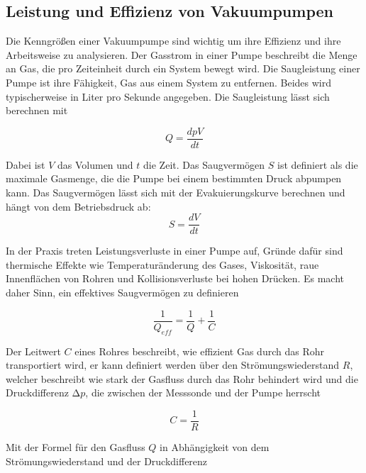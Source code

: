 \subsection{Leistung und Effizienz von Vakuumpumpen}


Die Kenngrößen einer Vakuumpumpe sind wichtig um ihre Effizienz und ihre Arbeitsweise zu analysieren.
Der Gasstrom in einer Pumpe beschreibt die Menge an Gas, die pro Zeiteinheit durch ein System bewegt wird. Die Saugleistung einer Pumpe ist ihre 
Fähigkeit, Gas aus einem System zu entfernen. Beides wird typischerweise in Liter pro Sekunde angegeben. Die Saugleistung lässt sich berechnen mit

\begin{equation}
    Q=\frac{dpV}{dt}
    \label{eq:saugleistung}
\end{equation}

Dabei ist \( V \) das Volumen und \( t \) die Zeit.
Das Saugvermögen $S$ ist definiert als die maximale Gasmenge, die die Pumpe bei einem bestimmten Druck abpumpen kann. Das Saugvermögen lässt sich 
mit der Evakuierungskurve berechnen und hängt von dem Betriebsdruck ab:
\begin{equation}
    S=\frac{dV}{dt}
    \label{eq:saugvermögen}
\end{equation} 

In der Praxis treten Leistungsverluste in einer Pumpe auf, Gründe dafür sind thermische Effekte wie Temperaturänderung des Gases,
Viskosität, raue Innenflächen von Rohren und Kollisionsverluste bei hohen Drücken. Es macht daher Sinn, ein effektives Saugvermögen zu definieren

\begin{equation}
    \frac{1}{Q_{eff}}=\frac{1}{Q}+\frac{1}{C}
    \label{eq:effektives_saugvermögen}
\end{equation}   

Der Leitwert \( C \) eines Rohres beschreibt, wie effizient Gas durch das Rohr transportiert wird, er kann definiert werden über 
den Strömungswiederstand \( R \), welcher beschreibt wie stark der Gasfluss durch das Rohr behindert wird 
und die Druckdifferenz \(\increment p\), die zwischen der Messsonde und der Pumpe herrscht

\begin{equation}
    C=\frac{1}{R}
    \label{eq:leitwert1}
\end{equation}

Mit der Formel für den Gasfluss \( Q \) in Abhängigkeit von dem Strömungswiederstand und der Druckdifferenz

